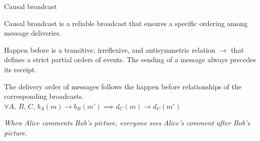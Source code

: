 \documentclass[10pt, xcolor={usenames, dvipsnames}]{beamer}
\begin{document}
\begin{frame}{Causal broadcast}

  Causal broadcast is a reliable broadcast that ensures a specific ordering
  among message deliveries. 
  
  \begin{definition}
    Happen before is a transitive, irreflexive, and antisymmetric relation
    $\rightarrow$ that defines a strict partial orders of events.  The sending
    of a message always precedes its receipt.
  \end{definition}

  \vspace{2em}

  \begin{definition}
    The delivery order of messages follows the happen before relationships of the
    corresponding broadcasts. $\forall A,\,B,\,C,\,
    b_A(m) \rightarrow b_B(m') \implies d_C(m) \rightarrow d_C(m')$
  \end{definition}

  \textit{When Alice comments Bob's picture, everyone sees Alice's comment after
    Bob's picture.}  

\end{frame}
\end{document}
